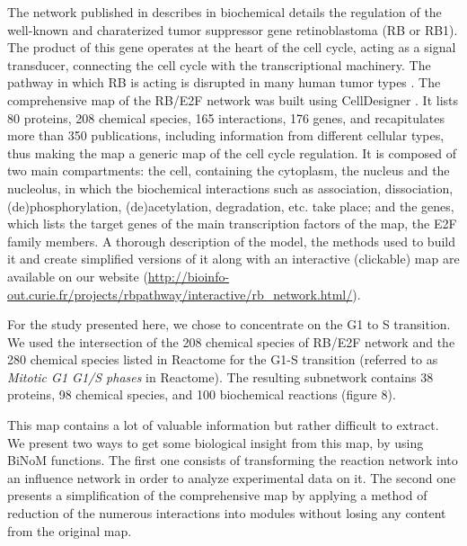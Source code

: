 \documentclass[10pt]{bmc_article}
\newenvironment{bmcformat}{\baselineskip20pt\sloppy\setboolean{publ}{false}}{\baselineskip20pt\sloppy}
\begin{document}
\begin{bmcformat}
The network published in \cite{calzone2008comprehensive} describes in
biochemical details the regulation of the well-known and charaterized tumor
suppressor gene retinoblastoma (RB or RB1). The product of this gene operates at
the heart of the cell cycle, acting as a signal transducer, connecting the
cell cycle with the transcriptional machinery. The pathway in which RB is
acting is disrupted in many human tumor types \cite{weinberg1995retinoblastoma}.
The comprehensive map of the RB/E2F network was built using CellDesigner
\cite{funahashi2003celldesigner}. It lists 80 proteins, 208 chemical species, 165
interactions, 176 genes, and recapitulates more than 350 publications, including
information from different cellular types, thus making the map a generic map of
the cell cycle regulation. It is composed of two main compartments: the cell,
containing the cytoplasm, the nucleus and the nucleolus, in which the
biochemical interactions such as association, dissociation, (de)phosphorylation,
(de)acetylation, degradation, etc. take place; and the genes, which lists the
target genes of the main transcription factors of the map, the E2F family
members.
A thorough description of the model, the methods used to build it and create
simplified versions of it along with an interactive (clickable) map are
available on our website
(\url{http://bioinfo-out.curie.fr/projects/rbpathway/interactive/rb_network.html/}).

For the study presented here, we chose to concentrate on the G1 to S transition. We
used the intersection of the 208 chemical species
of RB/E2F network and the 280 chemical species listed in Reactome \cite{joshi2005reactome} for the G1-S transition
(referred to as \emph{Mitotic G1 G1/S phases} in Reactome). The resulting
subnetwork contains 38 proteins, 98 chemical species, and 100 biochemical
reactions (figure 8).


This map contains a lot of valuable information but rather difficult to extract. We present two
ways to get some biological insight from this map, by using BiNoM functions. The first one consists of
transforming the reaction network into an influence network in order to analyze
experimental data on it. The second one presents a simplification of the comprehensive map by
applying a method of reduction of the numerous interactions into modules without
losing any content from the original map.


\end{bmcformat}
\end{document}
